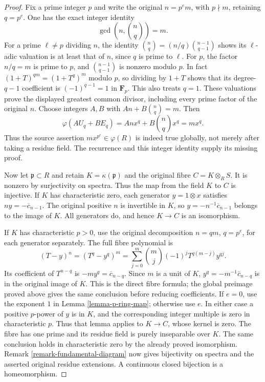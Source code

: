 \begin{proof}
Fix a prime integer $p$ and write
the original $n=p^e m$, with
$p\nmid m$, retaining $q=p^e$.
One has the exact integer identity
$$
\gcd\left(n,\binom nq\right)=m.
$$
For a prime $\ell\neq p$ dividing
$n$, the identity
$\binom nq=(n/q)\binom{n-1}{q-1}$
shows its $\ell$-adic valuation is
at least that of $n$, since
$q$ is prime to $\ell$.
For $p$, the factor $n/q=m$
is prime to $p$, and
$\binom{n-1}{q-1}$ is nonzero
modulo $p$. In fact
$(1+T)^{qm}=(1+T^q)^m$ modulo
$p$, so dividing by $1+T$ shows
that its degree-$q-1$ coefficient
is $(-1)^{q-1}=1$ in
$\mathbf F_p$. This also treats
$q=1$. These valuations prove
the displayed greatest common
divisor, including every prime
factor of the original $n$.
Choose integers $A,B$ with
$An+B\binom nq=m$. Then
$$
\varphi(AU_q+BE_q)
=A n x^q+B\binom nq x^q=m x^q.
$$
Thus the source assertion
$m x^{p^e}\in\varphi(R)$ is
indeed true globally, not merely
after taking a residue field.
The recurrence and this integer
identity supply its missing proof.

Now let $\mathfrak p\subset R$
and retain $K=\kappa(\mathfrak p)$
and the original fibre
$C=K\otimes_R S$. It is nonzero
by surjectivity on spectra. Thus
the map from the field $K$ to $C$
is injective. If $K$ has
characteristic zero, each generator
$y=1\otimes x$ satisfies
$n y=-\overline c_{n-1}$.
The original positive $n$ is
invertible in $K$, so
$y=-n^{-1}\overline c_{n-1}$
belongs to the image of $K$.
All generators do, and hence
$K\to C$ is an isomorphism.

If $K$ has characteristic $p>0$,
use the original decomposition
$n=q m$, $q=p^e$, for each
generator separately. The full
fibre polynomial is
$$
(T-y)^n=(T^q-y^q)^m
=\sum_{j=0}^m\binom mj(-1)^j
T^{q(m-j)}y^{qj}.
$$
Its coefficient of $T^{n-q}$
is $-m y^q=\overline c_{n-q}$.
Since $m$ is a unit of $K$,
$y^q=-m^{-1}\overline c_{n-q}$
is in the original image of $K$.
This is the direct fibre formula;
the global preimage proved above
gives the same conclusion before
reducing coefficients.
If $e=0$, use the exponent $1$
in Lemma \ref{lemma-p-ring-map};
otherwise use $e$. In either
case a positive $p$-power of $y$
is in $K$, and the corresponding
integer multiple is zero in
characteristic $p$. Thus that
lemma applies to $K\to C$, whose
kernel is zero. The fibre has
one prime and its residue field
is purely inseparable over $K$.
The same conclusion holds in
characteristic zero by the
already proved isomorphism.
Remark \ref{remark-fundamental-diagram}
now gives bijectivity on spectra
and the asserted original residue
extensions. A continuous closed
bijection is a homeomorphism.


\end{proof}
